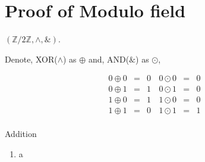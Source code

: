 \documentclass[a4paper,12pt]{article}
\begin{document}
\appendix

\section{Proof of Modulo field}
\label{appendix:modulo_field}

$(\mathbb{Z}/2\mathbb{Z} ,\wedge , \&)$.

Denote, XOR($\wedge$) as $\oplus$ and, AND($\&$) as $\odot$,

\begin{equation}
    \begin{matrix}
        0 \oplus 0 & = &0\\
        0 \oplus 1 & = &1\\
        1 \oplus 0 & = &1\\
        1 \oplus 1 & = &0\\
    \end{matrix}
    \, 
    \begin{matrix}
        0 \odot 0 & = &0\\
        0 \odot 1 & = &0\\
        1 \odot 0 & = &0\\
        1 \odot 1 & = &1\\
    \end{matrix}
\end{equation}

Addition 

\begin{enumerate}
    \item a
\end{enumerate}

  
  
\end{document}

